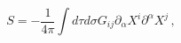 \begin{equation}
\label{lag2}
S=-\frac{1}{4\pi} \int d\tau d\sigma G_{ij} \partial_\alpha X^i \partial^\alpha X^j\,,
\end{equation}

